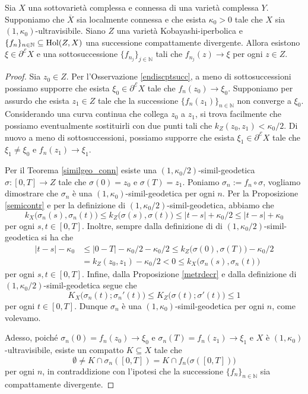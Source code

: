 \begin{lm} \label{limpt}
    Sia $X$ una sottovarietà complessa e connessa di una varietà complessa $Y$. Supponiamo che $\overline{X}$ sia localmente connessa e che esista $\kappa_0>0$ tale che $X$ sia $(1,\kappa_0)$-ultravisibile. Siano $Z$ una varietà Kobayashi-iperbolica e $\{f_n\}_{n\in\mathbb{N}}\subseteq\textnormal{Hol}(Z,X)$ una successione compattamente divergente. Allora esistono $\xi\in\partial^\mathcal{E}X$ e una sottosuccessione $\{f_{n_j}\}_{j\in\mathbb{N}}$ tali che $f_{n_j}(z)\longrightarrow\xi$ per ogni $z\in Z$.
\end{lm}

\begin{proof}
    Sia $z_0\in Z$. Per l'Osservazione \ref{endiscptsucc}, a meno di sottosuccessioni possiamo supporre che esista $\xi_0\in\partial^\mathcal{E}X$ tale che $f_n(z_0)\longrightarrow\xi_0$. Supponiamo per assurdo che esista $z_1\in Z$ tale che la successione $\{f_n(z_1)\}_{n\in\mathbb{N}}$ non converge a $\xi_0$. Considerando una curva continua che collega $z_0$ a $z_1$, si trova facilmente che possiamo eventualmente sostituirli con due punti tali che $k_Z(z_0,z_1)<\kappa_0/2$. Di nuovo a meno di sottosuccessioni, possiamo supporre che esista $\xi_1\in\partial^\mathcal{E}X$ tale che $\xi_1\not=\xi_0$ e $f_n(z_1)\longrightarrow\xi_1$.

    Per il Teorema \ref{similgeo_conn} esiste una $(1,\kappa_0/2)$-simil-geodetica $\sigma:[0,T]\longrightarrow Z$ tale che $\sigma(0)=z_0$ e $\sigma(T)=z_1$. Poniamo $\sigma_n:=f_n\circ\sigma$, vogliamo dimostrare che $\sigma_n$ è una $(1,\kappa_0)$-simil-geodetica per ogni $n$. Per la Proposizione \ref{semicontr} e per la definizione di $(1,\kappa_0/2)$-simil-geodetica, abbiamo che
    $$k_X\big(\sigma_n(s),\sigma_n(t)\big) \le k_Z\big(\sigma(s),\sigma(t)\big) \le |t-s|+\kappa_0/2\le |t-s|+\kappa_0$$
    per ogni $s,t\in[0,T]$. Inoltre, sempre dalla definizione di di $(1,\kappa_0/2)$-simil-geodetica si ha che
    \begin{align*}
        |t-s|-\kappa_0 &\le |0-T|-\kappa_0/2-\kappa_0/2 \le k_Z\big(\sigma(0),\sigma(T)\big)-\kappa_0/2\\
        &=k_Z(z_0,z_1)-\kappa_0/2<0\le k_X\big(\sigma_n(s),\sigma_n(t)\big)
    \end{align*}
    per ogni $s,t\in[0,T]$. Infine, dalla Proposizione \ref{metrdecr} e dalla definizione di $(1,\kappa_0/2)$-simil-geodetica segue che
    $$K_X\big(\sigma_n(t);\sigma_n'(t)\big)\le K_Z\big(\sigma(t);\sigma'(t)\big) \le 1$$
    per ogni $t\in[0,T]$. Dunque $\sigma_n$ è una $(1,\kappa_0)$-simil-geodetica per ogni $n$, come volevamo.

    Adesso, poiché $\sigma_n(0)=f_n(z_0)\longrightarrow\xi_0$ e $\sigma_n(T)=f_n(z_1)\longrightarrow\xi_1$ e $X$ è $(1,\kappa_0)$-ultravisibile, esiste un compatto $K\subseteq X$ tale che
    $$\emptyset\not=K\cap\sigma_n([0,T])=K\cap f_n\big(\sigma([0,T])\big)$$
    per ogni $n$, in contraddizione con l'ipotesi che la successione $\{f_n\}_{n\in\mathbb{N}}$ sia compattamente divergente.
\end{proof}

